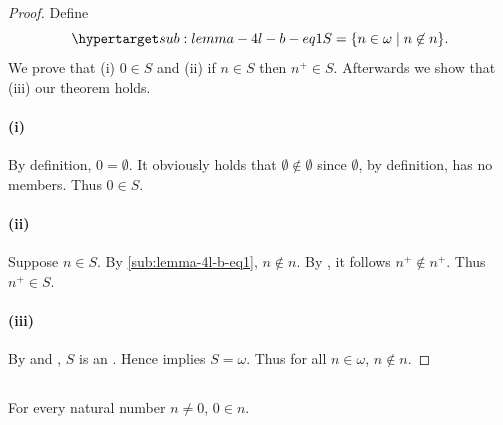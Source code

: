 \documentclass{report}
\begin{document}
\begin{proof}


  Define
    \begin{equation}
      \hyperlabel{sub:lemma-4l-b-eq1}
      S = \{n \in \omega \mid n \not\in n\}.
    \end{equation}
  We prove that (i) $0 \in S$ and (ii) if $n \in S$ then $n^+ \in S$.
  Afterwards we show that (iii) our theorem holds.

  \paragraph{(i)}%

    By definition, $0 = \emptyset$.
    It obviously holds that $\emptyset \not\in \emptyset$ since $\emptyset$,
      by definition, has no members.
    Thus $0 \in S$.

  \paragraph{(ii)}%

    Suppose $n \in S$.
    By \eqref{sub:lemma-4l-b-eq1}, $n \not\in n$.
    By , it follows $n^+ \not\in n^+$.
    Thus $n^+ \in S$.

  \paragraph{(iii)}%

    By  and , $S$ is an
      .
    Hence  implies $S = \omega$.
    Thus for all $n \in \omega$, $n \not\in n$.

\end{proof}

\subsection{}%

\begin{lemma}

  For every natural number $n \neq 0$, $0 \in n$.

\end{lemma}
\end{document}
